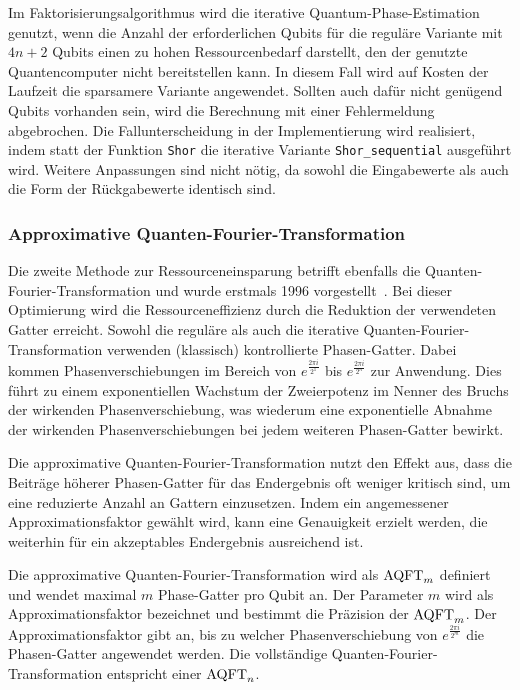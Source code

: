 \bigskip

Im Faktorisierungsalgorithmus wird die iterative Quantum-Phase-Estimation genutzt, 
wenn die Anzahl der erforderlichen Qubits für die reguläre Variante mit \(4n+2\) Qubits einen zu hohen Ressourcenbedarf darstellt, 
den der genutzte Quantencomputer nicht bereitstellen kann. 
In diesem Fall wird auf Kosten der Laufzeit die sparsamere Variante angewendet. 
Sollten auch dafür nicht genügend Qubits vorhanden sein, 
wird die Berechnung mit einer Fehlermeldung abgebrochen. 
Die Fallunterscheidung in der Implementierung wird realisiert, 
indem statt der Funktion \texttt{Shor} die iterative Variante \texttt{Shor_sequential} ausgeführt wird. 
Weitere Anpassungen sind nicht nötig, 
da sowohl die Eingabewerte als auch die Form der Rückgabewerte identisch sind.

\subsubsection{Approximative Quanten-Fourier-Transformation} \label{sec:ApproxQFT}
Die zweite Methode zur Ressourceneinsparung betrifft ebenfalls die Quanten-Fourier-Transformation und 
wurde erstmals 1996 vorgestellt~\cite{Barenco_1996}.
Bei dieser Optimierung wird die Ressourceneffizienz durch die Reduktion der verwendeten Gatter erreicht. 
Sowohl die reguläre als auch die iterative Quanten-Fourier-Transformation verwenden (klassisch) kontrollierte Phasen-Gatter.
Dabei kommen Phasenverschiebungen im Bereich von \(e^{\frac{2\pi i}{2^1}}\) bis \(e^{\frac{2\pi i}{2^n}}\) zur Anwendung. 
Dies führt zu einem exponentiellen Wachstum der Zweierpotenz im Nenner des Bruchs der wirkenden Phasenverschiebung, 
was wiederum eine exponentielle Abnahme der wirkenden Phasenverschiebungen bei jedem weiteren Phasen-Gatter bewirkt. 

Die approximative Quanten-Fourier-Transformation nutzt den Effekt aus, 
dass die Beiträge höherer Phasen-Gatter für das Endergebnis oft weniger kritisch sind, 
um eine reduzierte Anzahl an Gattern einzusetzen. 
Indem ein angemessener Approximationsfaktor gewählt wird, 
kann eine Genauigkeit erzielt werden, 
die weiterhin für ein akzeptables Endergebnis ausreichend ist.

Die approximative Quanten-Fourier-Transformation wird als \(\operatorname{AQFT}_m\) definiert und 
wendet maximal \(m\) Phase-Gatter pro Qubit an. 
Der Parameter \(m\) wird als Approximationsfaktor bezeichnet und bestimmt die Präzision der \(\operatorname{AQFT}_m\). 
Der Approximationsfaktor gibt an, 
bis zu welcher Phasenverschiebung von \(e^{\frac{2\pi i}{2^m}}\) die Phasen-Gatter angewendet werden.
Die vollständige Quanten-Fourier-Transformation entspricht einer \(\operatorname{AQFT}_n\).

